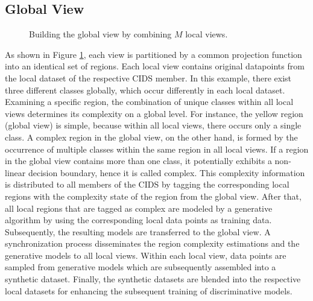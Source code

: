 \documentclass[../../main.tex]{subfiles}
\begin{document}
\subsection{Global View}\label{subsec:global_view}

\begin{figure}[b!]
    \centering
    
    \caption[Building of the global view]{Building the global view by combining $M$ local views.}
    \label{fig:global_view}
\end{figure}

As shown in Figure \ref{fig:global_view}, each view is partitioned by a common projection function into an identical set of regions. Each local view contains original datapoints from the local dataset of the respective CIDS member. In this example, there exist three different classes globally, which occur differently in each local dataset. Examining a specific region, the combination of unique classes within all local views determines its complexity on a global level. For instance, the yellow region (global view) is simple, because within all local views, there occurs only a single class. A complex region in the global view, on the other hand, is formed by the occurrence of multiple classes within the same region in all local views. If a region in the global view contains more than one class, it potentially exhibits a non-linear decision boundary, hence it is called complex. This complexity information is distributed to all members of the CIDS by tagging the corresponding local regions with the complexity state of the region from the global view. After that, all local regions that are tagged as complex are modeled by a generative algorithm by using the corresponding local data points as training data. Subsequently, the resulting models are transferred to the global view. A synchronization process disseminates the region complexity estimations and the generative models to all local views. Within each local view, data points are sampled from generative models which are subsequently assembled into a synthetic dataset. Finally, the synthetic datasets are blended into the respective local datasets for enhancing the subsequent training of discriminative models.
\end{document}
